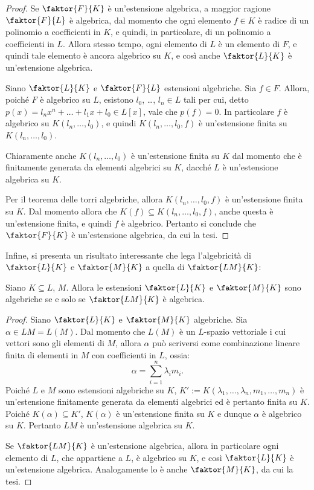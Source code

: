 \documentclass[12pt]{scrartcl}
\begin{document}
	\begin{proof}
		Se $\faktor{F}{K}$ è un'estensione algebrica,
		a maggior ragione $\faktor{F}{L}$ è
		algebrica, dal momento che ogni elemento $f \in K$ è
		radice di un polinomio a coefficienti in $K$, e
		quindi, in particolare, di un polinomio a coefficienti in
		$L$. Allora stesso tempo, ogni elemento di $L$ è un
		elemento di $F$, e quindi tale elemento è ancora algebrico
		su $K$, e così anche $\faktor{L}{K}$ è un'estensione
		algebrica. \medskip
		
		
		Siano $\faktor{L}{K}$ e $\faktor{F}{L}$
		estensioni algebriche. Sia $f \in F$. Allora, poiché $F$ è
		algebrico su $L$, esistono $l_0$, \ldots,
		$l_n \in L$ tali per cui, detto
		$p(x) = l_n x^n + \ldots + l_1 x + l_0 \in L[x]$,
		vale che $p(f) = 0$. In particolare $f$ è
		algebrico su $K(l_n, \ldots, l_0)$, e quindi
		$K(l_n, \ldots, l_0, f)$ è un'estensione finita
		su $K(l_n, \ldots, l_0)$. \medskip
		
		
		Chiaramente anche $K(l_n, \ldots, l_0)$ è un'estensione
		finita su $K$ dal momento che è finitamente generata
		da elementi algebrici su $K$, dacché $L$ è un'estensione
		algebrica su $K$. \medskip
		
		
		Per il teorema delle torri algebriche, allora
		$K(l_n, \ldots, l_0, f)$ è un'estensione finita
		su $K$. Dal momento allora che $K(f) \subseteq K(l_n, \ldots, l_0, f)$, anche questa è un'estensione finita,
		e quindi $f$ è algebrico. Pertanto si conclude che
		$\faktor{F}{K}$ è un'estensione algebrica, da cui
		la tesi.
	\end{proof}
	
	Infine, si presenta un risultato interessante che lega
	l'algebricità di $\faktor{L}{K}$ e $\faktor{M}{K}$ a quella
	di $\faktor{LM}{K}$:
	
	\begin{proposition}
		Siano $K \subseteq L$, $M$. Allora le estensioni
		$\faktor{L}{K}$ e $\faktor{M}{K}$ sono algebriche se
		e solo se $\faktor{LM}{K}$ è algebrica.
	\end{proposition}
	
	\begin{proof}
		Siano $\faktor{L}{K}$ e $\faktor{M}{K}$ algebriche.
		Sia $\alpha \in LM = L(M)$. Dal momento che $L(M)$ è un
		$L$-spazio vettoriale i cui vettori sono gli elementi di
		$M$, allora $\alpha$ può scriversi
		come combinazione lineare finita di elementi in $M$ con
		coefficienti in $L$, ossia:
		\[ \alpha = \sum_{i=1}^n \lambda_i m_i. \]
		Poiché $L$ e $M$ sono estensioni algebriche su $K$,
		$K' := K(\lambda_1, \ldots, \lambda_n, m_1, \ldots, m_n)$ è
		un'estensione finitamente generata da elementi algebrici
		ed è pertanto finita su $K$. Poiché $K(\alpha) \subseteq
		K'$, $K(\alpha)$ è un'estensione finita su $K$ e dunque
		$\alpha$ è algebrico su $K$. Pertanto $LM$ è un'estensione
		algebrica su $K$. \medskip
		
		
		Se $\faktor{LM}{K}$ è un'estensione algebrica, allora
		in particolare ogni elemento di $L$, che appartiene a $L$,
		è algebrico su $K$, e così $\faktor{L}{K}$ è un'estensione
		algebrica. Analogamente lo è anche $\faktor{M}{K}$, da cui
		la tesi.
	\end{proof}
\end{document}
